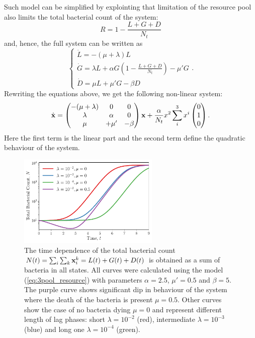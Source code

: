 \documentclass[10pt,A4paper]{article}
\begin{document}
Such model can be simplified by explointing that limitation of the resource pool also limits the total bacterial count of the system:
\begin{equation}
    R = 1 - \frac{L+G+D}{N_t}
\end{equation}
and, hence, the full system can be written as 
\begin{equation}
    \begin{cases}
        \dot{L} = -(\mu + \lambda) L\\
        \dot{G} = \lambda L + \alpha G\left(1-\frac{L+G+D}{N_t}\right)-\mu' G\\
        \dot{D} = \mu  L + \mu' G- \beta D 
        \label{eq:3pool_resource} 
    \end{cases}.
\end{equation}
Rewriting the equations above, we get the following non-linear system:
\begin{equation}
    \dot {\mathbf{x}} = \begin{pmatrix}
        -(\mu + \lambda) & 0       & 0 \\
         \lambda         & \alpha  & 0 \\
         \mu & + \mu'& - \beta 
    \end{pmatrix} 
    \mathbf{x} + \frac{\alpha}{N_t} x^2 \sum_i^3 x^i \begin{pmatrix} 0 \\ 1 \\ 0  \end{pmatrix}.
\end{equation}
Here the first term is the linear part and the second term define the quadratic behaviour of the system.

\begin{figure}[t]
    \begin{center}
    \includegraphics[width=0.6\textwidth]{Figures/pool_model_3pools_resource.pdf}
    \caption{{\footnotesize The time dependence of the total bacterial count $N(t) = \sum_i \sum_k \mathbf{x}_i^k = L(t) + G(t) + D(t)$ is obtained as a sum of bacteria in all states.
    All curves were calculated using the model (\ref{eq:3pool_resource}) with parameters $\alpha=2.5$, $\mu'=0.5$ and $\beta=5$.
    The purple curve shows significant dip in behaviour of the system where the death of the bacteria is present $\mu = 0.5$.
    Other curves show the case of no bacteria dying $\mu=0$ and represent different length of lag phases:
    short $\lambda=10^{-2}$ (red), intermediate $\lambda=10^{-3}$ (blue) and long one $\lambda=10^{-4}$ (green).
}}
    \label{fig:3pool_resource_plots}
    \end{center}
\end{figure}
\end{document}
